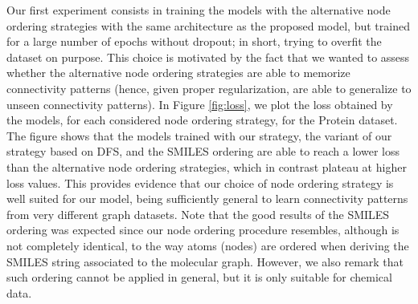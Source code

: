 Our first experiment consists in training the models with the alternative node ordering strategies with the same architecture as the proposed model, but trained for a large number of epochs without dropout; in short, trying to overfit the dataset on purpose. This choice is motivated by the fact that we wanted to assess whether the alternative node ordering strategies are able to memorize connectivity patterns (hence, given proper regularization, are able to generalize to unseen connectivity patterns). In Figure \ref{fig:loss}, we plot the loss obtained by the models, for each considered node ordering strategy, for the Protein dataset. The figure shows that the models trained with our strategy, the variant of our strategy based on DFS, and the SMILES ordering are able to reach a lower loss than the alternative node ordering strategies, which in contrast plateau at higher loss values. This provides evidence that our choice of node ordering strategy is well suited for our model, being sufficiently general to learn connectivity patterns from very different graph datasets. Note that the good results of the SMILES ordering was expected since our node ordering procedure resembles, although is not completely identical, to the way atoms (nodes) are ordered when deriving the SMILES string associated to the molecular graph. However, we also remark that such ordering cannot be applied in general, but it is only suitable for chemical data.

